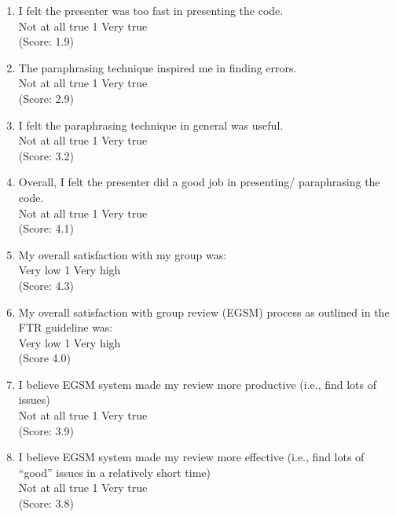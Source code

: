 \begin{enumerate}
\item I felt the presenter was too fast in presenting the code.
\\
Not at all true \hfill 1     \hfill Very true\\
(Score: 1.9)

\item The paraphrasing technique inspired me in finding errors.
\\
Not at all true \hfill 1     \hfill Very true\\
(Score: 2.9)

\item I felt the paraphrasing technique in general was useful.
\\
Not at all true \hfill 1     \hfill Very true\\
(Score: 3.2)

\item Overall, I felt the presenter did a good job in presenting/
paraphrasing the code.
\\
Not at all true \hfill 1     \hfill Very true\\
(Score: 4.1)

\item My overall satisfaction with my group was:
\\
Very low \hfill 1     \hfill Very high\\
(Score: 4.3)

\item My overall satisfaction with group review (EGSM) process as
outlined in the FTR guideline was:
\\
Very low \hfill 1     \hfill Very high\\
(Score 4.0)

\item I believe EGSM system made my review more productive (i.e., find
lots of issues) 
\\
Not at all true \hfill 1     \hfill Very true\\
(Score: 3.9)

\item I believe EGSM system made my review more effective
(i.e., find lots of ``good'' issues in a relatively short time)
\\
Not at all true \hfill 1     \hfill Very true\\
(Score: 3.8)


\end{enumerate}
